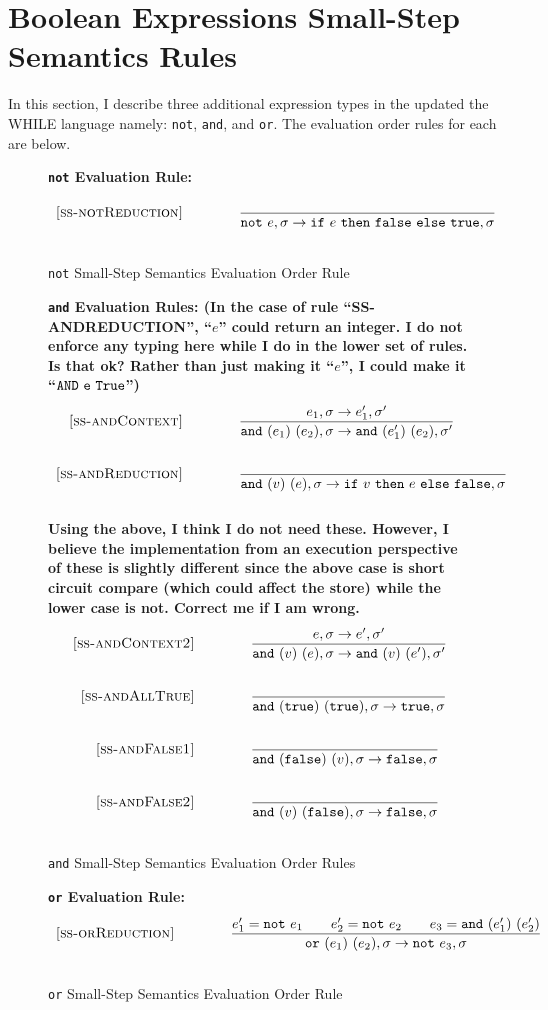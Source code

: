 \documentclass{article}
\newcommand{\ife}[3]{\mbox{\tt if}~{#1}~\mbox{\tt then}~{#2}~\mbox{\tt else}~{#3}}
\newcommand{\note}[1]{\mbox{\tt not}~#1}
\newcommand{\ande}[2]{\mbox{\tt and}~(#1)~(#2)}
\newcommand{\ore}[2]{\mbox{\tt or}~(#1)~(#2)}
\newcommand{\true}{\mbox{\tt true}}
\newcommand{\false}{\mbox{\tt false}}
\begin{document}
\section{Boolean Expressions Small-Step Semantics Rules}


In this section, I describe three additional expression types in the updated the WHILE language namely: {\tt not}, {\tt and}, and {\tt or}.  The evaluation order rules for each are below.

\begin{figure}[H]\label{fig:notRules}
\caption{{\tt not} Small-Step Semantics Evaluation Order Rule}
{\bf {\tt not} Evaluation Rule:} 
\[
\\
\begin{array}{r@{\qquad\qquad}l}
\ssrule{ss-notReduction}{
}{
  \sstep{\note{e}}{\sigma}{\ife{e}{\false}{\true}}{\sigma}
}
\end{array}
\]
\end{figure}

\begin{figure}[H]\label{fig:andRules}
\caption{{\tt and} Small-Step Semantics Evaluation Order Rules}
{\bf {\tt and} Evaluation Rules: (In the case of rule ``SS-ANDREDUCTION'', ``$e$'' could return an integer.  I do not enforce any typing here while I do in the lower set of rules.  Is that ok?  Rather than just making it ``$e$'', I could make it ``${\tt AND~e~True}$'')}
\[
\\
\begin{array}{r@{\qquad\qquad}l}
\ssrule{ss-andContext}{
  \sstep{e_1}{\sigma}{e_1'}{\sigma'}
}{
  \sstep{\ande{e_1}{e_2}}{\sigma}{\ande{e_1'}{e_2}}{\sigma'}
}
\ssrule{ss-andReduction}{
}{
  \sstep{\ande{v}{e}}{\sigma}{\ife{v}{e}{\false}}{\sigma}
}
\end{array}
\]
{\bf Using the above, I think I do not need these.  However, I believe the implementation
from an execution perspective of these is slightly different since the above case is short circuit compare (which could affect the store) while the lower case is not.  Correct me if I am wrong.} 
\[
\\
\begin{array}{r@{\qquad\qquad}l}
\ssrule{ss-andContext2}{
  \sstep{e}{\sigma}{e'}{\sigma'}
}{
  \sstep{\ande{v}{e}}{\sigma}{\ande{v}{e'}}{\sigma'}
}
\ssrule{ss-andAllTrue}{
}{
  \sstep{\ande{\true}{\true}}{\sigma}{\true}{\sigma}
}
\ssrule{ss-andFalse1}{
}{
  \sstep{\ande{\false}{v}}{\sigma}{\false}{\sigma}
}
\ssrule{ss-andFalse2}{
}{
  \sstep{\ande{v}{\false}}{\sigma}{\false}{\sigma}
}
\end{array}
\]
\end{figure}

\begin{figure}[H]\label{fig:orRules}
\caption{{\tt or} Small-Step Semantics Evaluation Order Rule}
{\bf {\tt or} Evaluation Rule:} 
\[
\\
\begin{array}{r@{\qquad\qquad}l}
\ssrule{ss-orReduction}{
  e_1'=\note{e_1} \qquad e_2'=\note{e_2} \qquad e_3=\ande{e_1'}{e_2'}
}{
  \sstep{\ore{e_1}{e_2}}{\sigma}{\note{e_3}}{\sigma}
}
\end{array}
\]
\end{figure}
\end{document}
